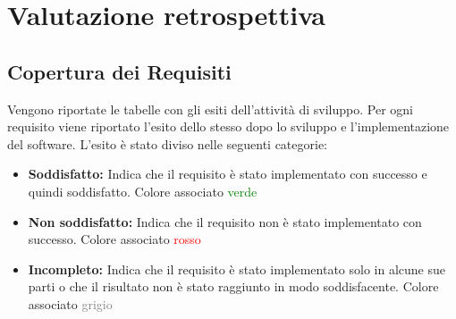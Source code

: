 
\chapter{Valutazione retrospettiva} %

\label{Chapter7} %



\section{Copertura dei Requisiti}

Vengono riportate le tabelle con gli esiti dell'attività di sviluppo. Per ogni
requisito viene riportato l'esito dello stesso dopo lo sviluppo e l'implementazione del
software. L'esito è stato diviso nelle seguenti categorie:
\begin{itemize}
\item \textbf{Soddisfatto:} Indica che il requisito è stato implementato con successo e quindi
soddisfatto. Colore associato \textcolor{green}{verde}
\item \textbf{Non soddisfatto:} Indica che il requisito non è stato implementato con successo.
Colore associato \textcolor{red}{rosso}
\item \textbf{Incompleto:} Indica che il requisito è stato implementato solo in alcune sue
parti o che il risultato non è stato raggiunto in modo soddisfacente. Colore associato \textcolor{gray}{grigio}
\end{itemize}

